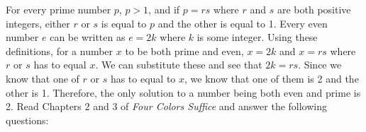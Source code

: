 \documentclass{article}
\begin{document}
For every prime number $p$, $p > 1$, and if $p = rs$ where $r$ and $s$ are both positive integers, either $r$ or $s$ is equal to $p$ and the other is equal to 1.
Every even number $e$ can be written as $e = 2k$ where $k$ is some integer. 
Using these definitions, for a number $x$ to be both prime and even, $x = 2k$ and $x = rs$ where $r$ or $s$ has to equal $x$.
We can substitute these and see that $2k = rs$.
Since we know that one of $r$ or $s$ has to equal to $x$, we know that one of them is 2 and the other is 1. Therefore, the only solution to a number being both even and prime is 2.
%
Read Chapters $2$ and $3$ of \emph{Four Colors Suffice} and answer the following questions:
\end{document}
